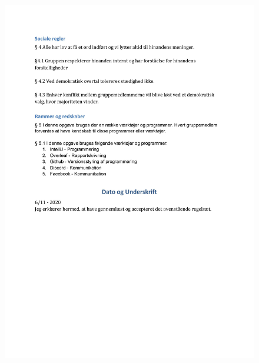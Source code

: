 \begin{figure}[H]
    \centering
    \includegraphics[width=17cm]{figures/Gruppekontrakt2.jpg}
\end{figure}